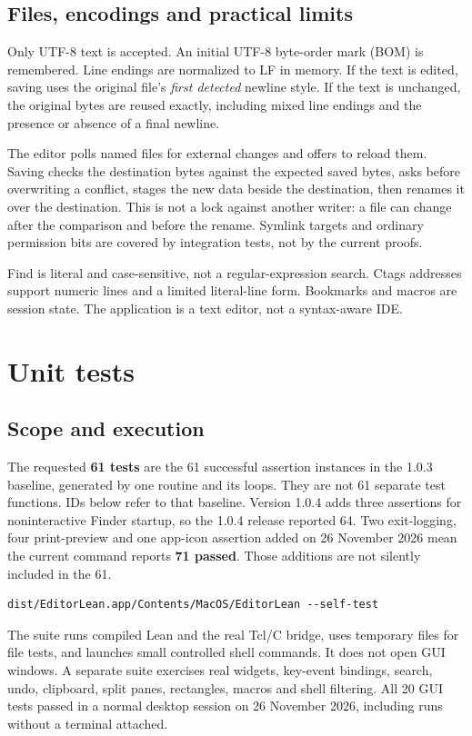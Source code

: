 \documentclass[11pt,letterpaper]{article}
\newcommand{\code}[1]{\texttt{\detokenize{#1}}}
\begin{document}
\subsection{Files, encodings and practical limits}
Only UTF-8 text is accepted. An initial UTF-8 byte-order mark (BOM) is remembered.
Line endings are normalized to LF in memory. If the text is edited, saving uses
the original file's \emph{first detected} newline style. If the text is unchanged,
the original bytes are reused exactly, including mixed line endings and the
presence or absence of a final newline.

The editor polls named files for external changes and offers to reload them.
Saving checks the destination bytes against the expected saved bytes, asks before
overwriting a conflict, stages the new data beside the destination, then renames
it over the destination. This is not a lock against another writer: a file can
change after the comparison and before the rename. Symlink targets and ordinary
permission bits are covered by integration tests, not by the current proofs.

Find is literal and case-sensitive, not a regular-expression search. Ctags
addresses support numeric lines and a limited literal-line form. Bookmarks and
macros are session state. The application is a text editor, not a syntax-aware IDE.

\clearpage
\section{Unit tests}\label{sec:tests}
\subsection{Scope and execution}
The requested \textbf{61 tests} are the 61 successful assertion instances in the
1.0.3 baseline, generated by one \code{selfTests} routine and its loops. They are
not 61 separate test functions. IDs below refer to that baseline. Version 1.0.4
adds three assertions for noninteractive Finder startup, so the 1.0.4 release
reported 64. Two exit-logging, four print-preview and one app-icon assertion
added on 26 November 2026 mean the current command reports \textbf{71 passed}. Those additions are not silently included in the 61.

\begin{lstlisting}
dist/EditorLean.app/Contents/MacOS/EditorLean --self-test
\end{lstlisting}

The suite runs compiled Lean and the real Tcl/C bridge, uses temporary files for
file tests, and launches small controlled shell commands. It does not open GUI
windows. A separate \code{--gui-self-test} suite exercises real widgets,
key-event bindings, search, undo, clipboard, split panes, rectangles, macros and
shell filtering. All 20 GUI tests passed in a normal desktop session on
26 November 2026, including runs without a terminal attached.
\end{document}

